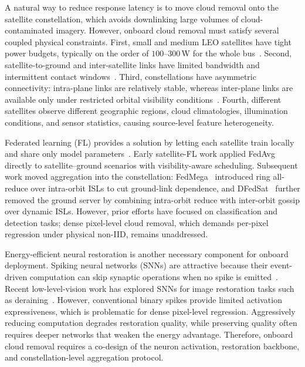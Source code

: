 \documentclass[conference]{IEEEtran}
\begin{document}
A natural way to reduce response latency is to move cloud removal
onto the satellite constellation, which avoids downlinking large
volumes of cloud-contaminated imagery. However, onboard cloud removal
must satisfy several coupled physical constraints. First, small and
medium LEO satellites have tight power budgets, typically on the
order of $100$--$300$\,W for the whole bus~\cite{ref:spacecpn1}.
Second, satellite-to-ground and inter-satellite links have limited
bandwidth and intermittent contact windows~\cite{ref:spacecpn1}.
Third, constellations have asymmetric connectivity: intra-plane links
are relatively stable, whereas inter-plane links are available only
under restricted orbital visibility conditions~\cite{ref:walker1984}.
Fourth, different satellites observe different geographic regions,
cloud climatologies, illumination conditions, and sensor statistics,
causing source-level feature heterogeneity.

Federated learning (FL) provides a solution by letting each satellite
train locally and share only model parameters~\cite{ref:fedavg}.
Early satellite-FL work applied FedAvg directly to satellite--ground
scenarios with visibility-aware scheduling. Subsequent work moved
aggregation into the constellation: FedMega~\cite{ref:fedmega2024}
introduced ring all-reduce over intra-orbit ISLs to cut ground-link
dependence, and DFedSat~\cite{ref:dfedsat} further removed the ground
server by combining intra-orbit reduce with inter-orbit gossip over
dynamic ISLs. However, prior efforts have focused on classification
and detection tasks; dense pixel-level cloud removal, which demands
per-pixel regression under physical non-IID, remains unaddressed.


Energy-efficient neural restoration is another necessary component
for onboard deployment. Spiking neural networks (SNNs) are attractive
because their event-driven computation can skip synaptic operations
when no spike is emitted~\cite{ref:loihi}. Recent low-level-vision
work has explored SNNs for image restoration tasks such as
deraining~\cite{ref:esdnet}. However, conventional binary spikes
provide limited activation expressiveness, which is problematic for
dense pixel-level regression. Aggressively reducing computation
degrades restoration quality, while preserving quality often requires
deeper networks that weaken the energy advantage. Therefore, onboard
cloud removal requires a co-design of the neuron activation,
restoration backbone, and constellation-level aggregation protocol.
\end{document}
